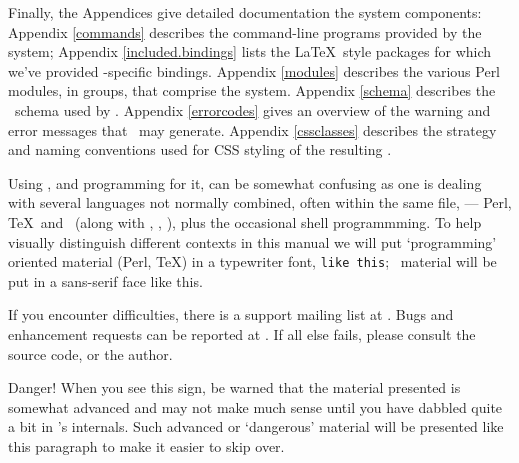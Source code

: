 \documentclass{book}
\begin{document}
Finally, the Appendices give detailed documentation the system components:
Appendix \ref{commands} describes the command-line programs provided by the system;
Appendix \ref{included.bindings} lists the \LaTeX\ style packages for which
we've provided \LaTeXML-specific bindings.
Appendix \ref{modules}
describes the various Perl modules, in groups, that comprise the system.
Appendix \ref{schema} describes the \XML\ schema used by \LaTeXML.
Appendix \ref{errorcodes} gives an overview of the warning and
error messages that \LaTeXML\ may generate.
Appendix \ref{cssclasses} describes the strategy and naming conventions
used for CSS styling of the resulting \HTML.

Using \LaTeXML, and programming for it, can be somewhat confusing as one is dealing with several
languages not normally combined, often within the same file,
--- Perl, \TeX\ and \XML\ (along with \XSLT, \HTML, \CSS),
plus the occasional shell programmming.
To help visually distinguish different contexts in this manual
we will put `programming' oriented material (Perl, \TeX) in a typewriter font,
\texttt{like this}; \XML\ material will be put in a sans-serif face
\textsf{like this}.

\vskip 1cm\relax
If you encounter difficulties, there is a support mailing list at
.
Bugs and enhancement requests can be reported at
.
If all else fails, please consult the source code, or the author.

\begin{advanced}
Danger! When you see this sign, be warned that the material presented is
somewhat advanced and may not make much sense until you have dabbled quite
a bit in \LaTeXML's internals.
Such advanced or `dangerous' material will be presented like this paragraph
to make it easier to skip over.
\end{advanced}

\end{document}
